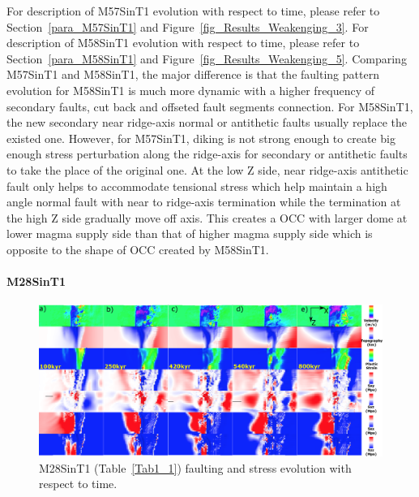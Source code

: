 For description of M57SinT1 evolution with respect to time, please refer to Section~\hyperref[para_M57SinT1]{\ref{para_M57SinT1}} and Figure~\hyperref[fig_Results_Weakenging_3]{\ref{fig_Results_Weakenging_3}}. For description of M58SinT1 evolution with respect to time, please refer to  Section~\hyperref[para_M58SinT1]{\ref{para_M58SinT1}} and Figure~\hyperref[fig_Results_Weakenging_5]{\ref{fig_Results_Weakenging_5}}. Comparing M57SinT1 and M58SinT1, the major difference is that the faulting pattern evolution for M58SinT1 is much more dynamic with a higher frequency of secondary faults, cut back and offseted fault segments connection. For M58SinT1, the new secondary near ridge-axis normal or antithetic faults usually replace the existed one. However, for M57SinT1, diking is not strong enough to create big enough stress perturbation along the ridge-axis for secondary or antithetic faults to take the place of the original one. At the low Z side, near ridge-axis antithetic fault only helps to accommodate tensional stress which help maintain a high angle normal fault with near to ridge-axis termination while the termination at the high Z side gradually move off axis. This creates a OCC with larger dome at lower magma supply side than that of higher magma supply side which is opposite to the shape of OCC created by M58SinT1. 

\paragraph{M28SinT1}\label{para_M28SinT1}

\begin{figure}[h]
 \centering
  \includegraphics[width=1.0\textwidth]{fig_Results_MRange_1_M28SinT1_time_evolution.eps}
 \caption{M28SinT1 (Table~\hyperref[Tab1_1]{\ref{Tab1_1}}) faulting and stress evolution with respect to time.}
\label{fig_Results_MRange_1}
\end{figure}

